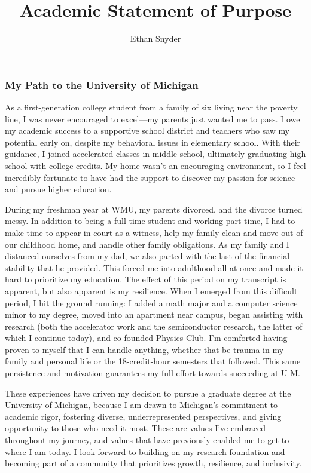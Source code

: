 \documentclass[11pt]{article}
\title{\vspace{-5em}Academic Statement of Purpose\\
	\large \dept{}}
\author{Ethan Snyder}
\date{}
\newcommand{\school}{University of Michigan}
\newcommand{\schoolabbr}{U-M}
\begin{document}
\maketitle
\subsubsection*{My Path to the \school{}}
As a first-generation college student from a family of six living near the poverty line, I was never encouraged to excel—my parents just wanted me to pass. I owe my academic success to a supportive school district and teachers who saw my potential early on, despite my behavioral issues in elementary school. With their guidance, I joined accelerated classes in middle school, ultimately graduating high school with college credits. My home wasn't an encouraging environment, so I feel incredibly fortunate to have had the support to discover my passion for science and pursue higher education.

During my freshman year at WMU, my parents divorced, and the divorce turned messy. In addition to being a full-time student and working part-time, I had to make time to appear in court as a witness, help my family clean and move out of our childhood home, and handle other family obligations. As my family and I distanced ourselves from my dad, we also parted with the last of the financial stability that he provided. This forced me into adulthood all at once and made it hard to prioritize my education. The effect of this period on my transcript is apparent, but also apparent is my resilience. When I emerged from this difficult period, I hit the ground running: I added a math major and a computer science minor to my degree, moved into an apartment near campus, began assisting with research (both the accelerator work and the semiconductor research, the latter of which I continue today), and co-founded Physics Club. I'm comforted having proven to myself that I can handle anything, whether that be trauma in my family and personal life or the 18-credit-hour semesters that followed. This same persistence and motivation guarantees my full effort towards succeeding at \schoolabbr{}.

These experiences have driven my decision to pursue a graduate degree at the University of Michigan, because I am drawn to Michigan's commitment to academic rigor, fostering diverse, underrepresented perspectives, and giving opportunity to those who need it most. These are values I've embraced throughout my journey, and values that have previously enabled me to get to where I am today. I look forward to building on my research foundation and becoming part of a community that prioritizes growth, resilience, and inclusivity.
\end{document}
